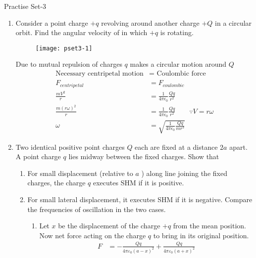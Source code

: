 \newpage
\begin{abox}
	Practise Set-3
	\end{abox}
\begin{enumerate}[label=\color{ocre}\textbf{\arabic*.}]
\item Consider a point charge $+q$ revolving around another charge $+Q$ in a circular orbit. Find the angular velocity of in which $+q$ is rotating.
	\begin{figure}[H]
		\begin{center}
			\texttt{[image: pset3-1]}
		\end{center}
	\end{figure}
	\begin{answer}
		Due to mutual repulsion of charges $q$ makes a circular motion around $Q$
		\begin{align*}
		\text{Necessary centripetal motion}&=\text{ Coulombic force}\\
		F_{centripetal}&=F_{coulombic}\\
		\frac{mV^{2}}{r}&=\frac{1}{4\pi \epsilon_{0}}\frac{Qq}{r^{2}}\\
		\frac{m{(r \omega)}^{2}}{r}&=\frac{1}{4\pi \epsilon_{0}}\frac{Qq}{r^{2}}\qquad \because V=r\omega\\
		\omega&=\sqrt{ \frac{1}{4\pi \epsilon_{0}}\frac{Qq}{mr^{3}}}
		\end{align*}
	\end{answer}
\item Two identical positive point charges $Q$ each are fixed at a distance $2 a$ apart. A point charge $q$ lies midway between the fixed charges. Show that
\begin{enumerate}
	\item For small displacement (relative to $a$ ) along line joining the fixed charges, the charge $q$ executes SHM if it is positive.
	\item For small lateral displacement, it executes SHM if it is negative. Compare the frequencies of oscillation in the two cases.
	\begin{answer}\hspace{0.5cm}
		\begin{enumerate}[label=(\alph*)]
			\item Let $x$ be the displacement of the charge $+q$ from the mean position. Now net force acting on the charge $q$ to bring in its original position.
			\begin{align*}
				F &=-\frac{Q q}{4 \pi \varepsilon_{0}(a-x)^{2}}+\frac{Q q}{4 \pi \varepsilon_{0}(a+x)^{2}} \\

\end{align*}
\end{enumerate}
\end{answer}
\end{enumerate}
\end{enumerate}
